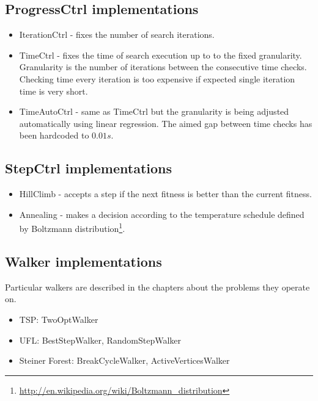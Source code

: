 \subsection{ProgressCtrl implementations}
\begin{itemize}
\item IterationCtrl - fixes the number of search iterations.
\item TimeCtrl - fixes the time of search execution up to to the fixed granularity.
	Granularity is the number of iterations between the consecutive time checks.
	Checking time every iteration is too expensive if expected single iteration time
	is very short.
\item TimeAutoCtrl - same as TimeCtrl but the granularity is being adjusted
	automatically using linear regression. The aimed gap between time checks has
	been hardcoded to $0.01s$.
\end{itemize}

\subsection{StepCtrl implementations}
\begin{itemize}
\item HillClimb - accepts a step if the next fitness is better than the current fitness.
\item Annealing - makes a decision according to the temperature schedule defined by
	\mbox{Boltzmann} distribution\footnote{\url{http://en.wikipedia.org/wiki/Boltzmann_distribution}}.
\end{itemize}

\subsection{Walker implementations}
Particular walkers are described in the chapters about the problems they operate on.
\begin{itemize}
\item TSP: TwoOptWalker
\item UFL: BestStepWalker, RandomStepWalker
\item Steiner Forest: BreakCycleWalker, ActiveVerticesWalker
\end{itemize}

